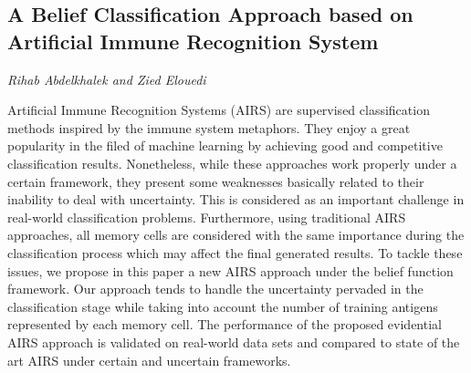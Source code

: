 \documentclass[../booklet.tex]{subfiles}
\begin{document}
\subsection[A Belief Classification Approach based on Artificial Immune Recognition System. {\it Rihab Abdelkhalek and Zied Elouedi}]{A Belief Classification Approach based on Artificial Immune Recognition System}
 

\begin{center}
  {\it Rihab Abdelkhalek and Zied Elouedi}
\end{center}









Artificial Immune Recognition Systems (AIRS) are  supervised
classification methods inspired by the immune system metaphors. They enjoy a great popularity in the filed of machine learning by achieving good and competitive classification results. Nonetheless, while these approaches work properly under a certain framework, they
present some weaknesses basically related to their inability to deal with uncertainty. This is considered as an important challenge in real-world classification problems. Furthermore, using traditional AIRS approaches, all memory cells  are considered with the same importance during the classification process which may affect the final generated results. To tackle these issues, we propose in this paper a new AIRS approach under the belief function framework. Our approach tends to handle the uncertainty pervaded in the classification stage while taking into account the number of training antigens represented by each memory
cell. The performance of the proposed
evidential AIRS approach is validated on real-world data sets and compared to state of the art AIRS under certain and uncertain frameworks.



\end{document}
